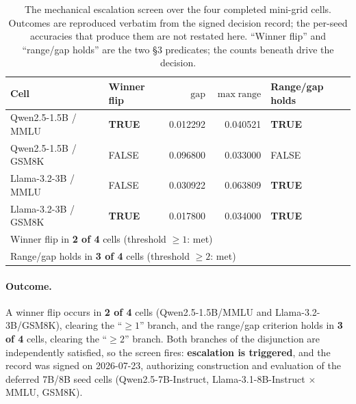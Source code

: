 \begin{table}[!t]
\centering
\small
\caption{The mechanical escalation screen over the four completed mini-grid
cells. Outcomes are reproduced verbatim from the signed decision record; the
per-seed accuracies that produce them are not restated here. ``Winner flip''
and ``range/gap holds'' are the two \S3 predicates; the counts beneath drive the
decision.}
\label{tab:minigrid-escalation}
\setlength{\tabcolsep}{4pt}
\small
\begin{tabular}{ll rr >{\raggedright\arraybackslash}p{2.4cm}}
\toprule
Cell & Winner flip & $\mathrm{gap}$ & $\max\mathrm{range}$ & Range/gap holds \\
\midrule
Qwen2.5-1.5B / MMLU  & \textbf{TRUE}  & 0.012292 & 0.040521 & \textbf{TRUE} \\
Qwen2.5-1.5B / GSM8K & FALSE          & 0.096800 & 0.033000 & FALSE \\
Llama-3.2-3B / MMLU  & FALSE          & 0.030922 & 0.063809 & \textbf{TRUE} \\
Llama-3.2-3B / GSM8K & \textbf{TRUE}  & 0.017800 & 0.034000 & \textbf{TRUE} \\
\midrule
\multicolumn{5}{l}{Winner flip in \textbf{2 of 4} cells (threshold $\geq 1$: met)} \\
\multicolumn{5}{l}{Range/gap holds in \textbf{3 of 4} cells (threshold $\geq 2$: met)} \\
\bottomrule
\end{tabular}
\end{table}

\paragraph{Outcome.}
A winner flip occurs in \textbf{2 of 4} cells (Qwen2.5-1.5B/MMLU and
Llama-3.2-3B/GSM8K), clearing the ``$\geq 1$'' branch, and the range/gap
criterion holds in \textbf{3 of 4} cells, clearing the ``$\geq 2$'' branch. Both
branches of the disjunction are independently satisfied, so the screen fires:
\textbf{escalation is triggered}, and the record was signed on 2026-07-23,
authorizing construction and evaluation of the deferred 7B/8B seed cells
(Qwen2.5-7B-Instruct, Llama-3.1-8B-Instruct $\times$ MMLU, GSM8K).

